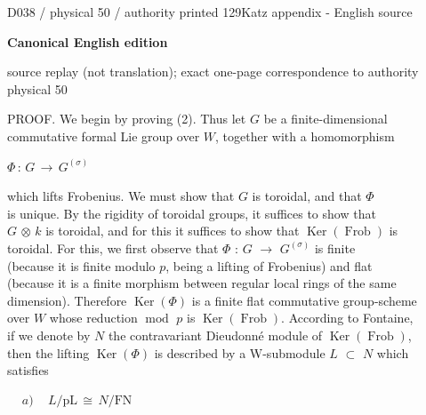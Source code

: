 \documentclass[9pt]{article}
\newcommand{\CanonText}[1]{\par{\fontsize{8.0}{9.35}\selectfont\RaggedRight #1\par}\vspace{2.2pt}}
\newcommand{\CanonDisplay}[1]{\par\vspace{1.2pt}\begin{center}{\fontsize{7.2}{8.4}\selectfont\(\displaystyle #1\)}\end{center}\vspace{1.2pt}}
\newenvironment{CanonMathBlock}{\par\vspace{1.2pt}\begin{center}\fontsize{6.8}{8.0}\selectfont\(\displaystyle}{\)\end{center}\vspace{1.2pt}}
\newcommand{\LayerTitle}{Canonical English edition}
\begin{document}
\noindent\begin{minipage}[t][\dimexpr\textheight-5pt\relax][t]{\textwidth}
{\sffamily\fontsize{7.3}{8.2}\selectfont\color{Quiet} D038 / physical 50 / authority printed 129\hfill Katz appendix - English source}
\par{}\vspace{4.5pt}
{\sffamily\fontsize{10.4}{11.6}\selectfont\bfseries\color{Accent} \LayerTitle}
\par{\sffamily\fontsize{6.7}{7.7}\selectfont\color{Quiet} source replay (not translation); exact one-page correspondence to authority physical 50}
\vspace{5pt}
\CanonText{PROOF. We begin by proving (2). Thus let \(G\) be a finite-dimensional\\commutative formal Lie group over \(W\), together with a homomorphism}
\CanonDisplay{\Phi{}\,:\,G\,\to{}\,G^{(\sigma{})}}
\CanonText{which lifts Frobenius. We must show that \(G\) is toroidal, and that \(\Phi{}\)\\is unique. By the rigidity of toroidal groups, it suffices to show that\\\(G\) \(\otimes{}\) \(k\) is toroidal, and for this it suffices to show that \(\operatorname{Ker}(\operatorname{Frob})\) is\\toroidal. For this, we first observe that \(\Phi{}\) : \(G\) \(\to{}\) \(G^{(\sigma{})}\) is finite\\(because it is finite modulo \(p\), being a lifting of Frobenius) and flat\\(because it is a finite morphism between regular local rings of the same\\dimension). Therefore \(\operatorname{Ker}(\Phi{})\) is a finite flat commutative group-scheme\\over \(W\) whose reduction \(\operatorname{mod}\) \(p\) is \(\operatorname{Ker}(\operatorname{Frob})\). According to Fontaine,\\if we denote by \(N\) the contravariant Dieudonné module of \(\operatorname{Ker}(\operatorname{Frob})\),\\then the lifting \(\operatorname{Ker}(\Phi{})\) is described by a W-submodule \(L\) \(\subset{}\) \(N\) which\\satisfies}
\begin{CanonMathBlock}
\begin{aligned}
& a)\quad\,L/\text{pL}\,\cong{}\,N/\mathrm{FN}\\

\end{aligned}
\end{CanonMathBlock}
\end{minipage}
\end{document}
